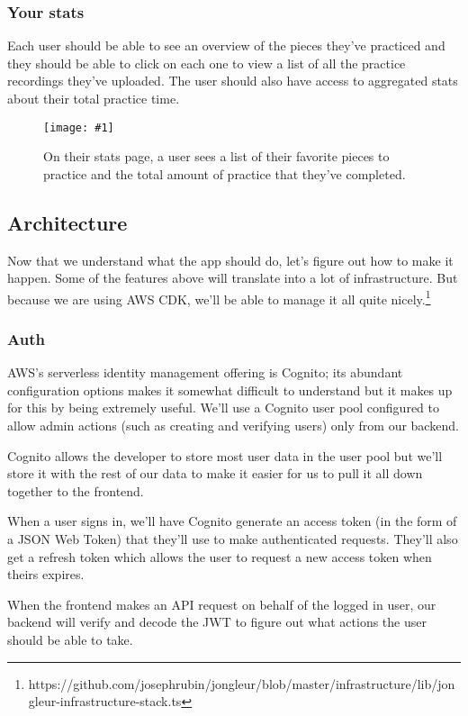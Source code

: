 \documentclass{article}
\newcommand{\screenshot}[2]{
  \begin{figure}[h]
    \texttt{[image: \#1]}
    \caption*{#2}
  \end{figure}
}
\begin{document}
\subsubsection{Your stats}

Each user should be able to see an overview of the pieces they've practiced and they should be able to click on each one to view a list of all the practice recordings they've uploaded.
The user should also have access to aggregated stats about their total practice time.

\screenshot{jong-stats}{On their stats page, a user sees a list of their favorite pieces to practice and the total amount of practice that they've completed.}

\subsection{Architecture}

Now that we understand what the app should do, let's figure out how to make it happen.
Some of the features above will translate into a lot of infrastructure.
But because we are using AWS CDK, we'll be able to manage it all quite nicely.\footnote{https://github.com/josephrubin/jongleur/blob/master/infrastructure/lib/jongleur-infrastructure-stack.ts}

\subsubsection{Auth}

AWS's serverless identity management offering is Cognito; its abundant configuration options makes it somewhat difficult to understand but it makes up for this by being extremely useful.
We'll use a Cognito user pool configured to allow admin actions (such as creating and verifying users) only from our backend.

Cognito allows the developer to store most user data in the user pool but we'll store it with the rest of our data to make it easier for us to pull it all down together to the frontend.

When a user signs in, we'll have Cognito generate an access token (in the form of a JSON Web Token) that they'll use to make authenticated requests.
They'll also get a refresh token which allows the user to request a new access token when theirs expires.

When the frontend makes an API request on behalf of the logged in user, our backend will verify and decode the JWT to figure out what actions the user should be able to take.
\end{document}
